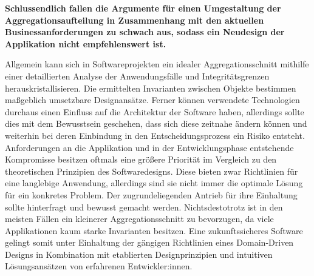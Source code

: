 \textbf{Schlussendlich fallen die Argumente für einen Umgestaltung der Aggregationsaufteilung in Zusammenhang mit den aktuellen Businessanforderungen zu schwach aus, sodass ein Neudesign der Applikation nicht empfehlenswert ist.}

Allgemein kann sich in Softwareprojekten ein idealer Aggregationsschnitt mithilfe einer detaillierten Analyse der Anwendungsfälle und Integritätsgrenzen herauskristallisieren. Die ermittelten Invarianten zwischen Objekte bestimmen maßgeblich umsetzbare Designansätze. Ferner können verwendete Technologien durchaus einen Einfluss auf die Architektur der Software haben, allerdings sollte dies mit dem Bewusstsein geschehen, dass sich diese zeitnahe ändern können und weiterhin bei deren Einbindung in den Entscheidungsprozess ein Risiko entsteht. Anforderungen an die Applikation und in der Entwicklungsphase entstehende Kompromisse besitzen oftmals eine größere Priorität im Vergleich zu den theoretischen Prinzipien des Softwaredesigns. Diese bieten zwar Richtlinien für eine langlebige Anwendung, allerdings sind sie nicht immer die optimale Lösung für ein konkretes Problem. Der zugrundeliegenden Antrieb für ihre Einhaltung sollte hinterfragt und bewusst gemacht werden. Nichtsdestotrotz ist in den meisten Fällen ein kleinerer Aggregationsschnitt zu bevorzugen, da viele Applikationen kaum starke Invarianten besitzen. Eine zukunftssicheres Software gelingt somit unter Einhaltung der gängigen Richtlinien eines Domain-Driven Designs in Kombination mit etablierten Designprinzipien und intuitiven Lösungsansätzen von erfahrenen Entwickler:innen.  

